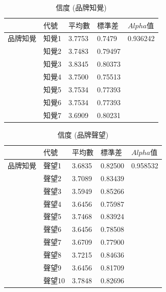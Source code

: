 \begin{table}[htb]
\caption{信度 (品牌知覺)}
\label{tab:e2}
\renewcommand{\arraystretch}{1.2} %
\arrayrulewidth=1pt               %
\tabcolsep=6pt                   %
\begin{tabular}[t]{lllll}  %
\hline
 & $代號$& $平均數$ & $標準差$& $ Alpha 值 $ \\
\hline
品牌知覺 & 知覺1  & 3.7753   & 0.7479  &0.936242 \\
              & 知覺2  & 3.7483  &0.79497  &  \\
             & 知覺3  & 3.8345    & 0.80373  &  \\
             & 知覺4 & 3.7500   &0.75513  &\\
             & 知覺5   & 3.7534  & 0.77393 &  \\
             & 知覺6  & 3.7534    &  0.77393 & \\
             & 知覺7  & 3.6909     & 0.80231  &  \\
\hline
\end{tabular}
\end{table}

\begin{table}[htb]
\caption{信度 (品牌聲望)}
\label{tab:e3}
\renewcommand{\arraystretch}{1.2} %
\arrayrulewidth=1pt               %
\tabcolsep=6pt                   %
\begin{tabular}[t]{lllll}  %
\hline
 & $代號$& $平均數$ & $標準差$& $ Alpha 值 $ \\
\hline
品牌知覺 & 聲望1  & 3.6835 &0.82500 &0.958532\\
              & 聲望2  & 3.7089 &0.83439 &  \\
             & 聲望3  &3.5949 &0.85266  &  \\
             & 聲望4  &3.6456&0.75987\\
             & 聲望5  & 3.7468 &0.83924 &  \\
             & 聲望6  & 3.6456&0.78508& \\
             & 聲望7  & 3.6709&0.77900  &  \\
             & 聲望8  & 3.7215&0.84636&  \\
             & 聲望9  &3.6456&0.81709&  \\
             & 聲望10  & 3.7848&0.82696 &  \\
\hline
\end{tabular}
\end{table}

